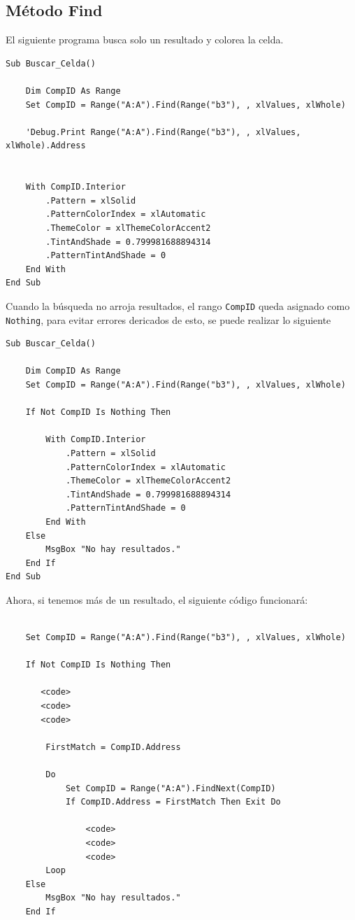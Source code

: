 \subsection{Método Find}


El siguiente programa busca solo un resultado y colorea la celda.

\begin{verbatim}
Sub Buscar_Celda()

    Dim CompID As Range
    Set CompID = Range("A:A").Find(Range("b3"), , xlValues, xlWhole)
    
    'Debug.Print Range("A:A").Find(Range("b3"), , xlValues, xlWhole).Address

    
    With CompID.Interior
        .Pattern = xlSolid
        .PatternColorIndex = xlAutomatic
        .ThemeColor = xlThemeColorAccent2
        .TintAndShade = 0.799981688894314
        .PatternTintAndShade = 0
    End With
End Sub
\end{verbatim}

Cuando la búsqueda no arroja resultados, el rango \texttt{CompID} queda asignado como \texttt{Nothing}, para evitar errores dericados de esto, se puede realizar lo siguiente

\begin{verbatim}
Sub Buscar_Celda()

    Dim CompID As Range
    Set CompID = Range("A:A").Find(Range("b3"), , xlValues, xlWhole)
    
    If Not CompID Is Nothing Then
    
        With CompID.Interior
            .Pattern = xlSolid
            .PatternColorIndex = xlAutomatic
            .ThemeColor = xlThemeColorAccent2
            .TintAndShade = 0.799981688894314
            .PatternTintAndShade = 0
        End With
    Else
        MsgBox "No hay resultados."
    End If
End Sub
\end{verbatim}


Ahora, si tenemos más de un resultado, el siguiente código funcionará:

\begin{verbatim}

    Set CompID = Range("A:A").Find(Range("b3"), , xlValues, xlWhole)
    
    If Not CompID Is Nothing Then
    
       <code>
       <code>
       <code>
       
        FirstMatch = CompID.Address
        
        Do
            Set CompID = Range("A:A").FindNext(CompID)
            If CompID.Address = FirstMatch Then Exit Do
            
                <code>
                <code>
                <code>
        Loop
    Else
        MsgBox "No hay resultados."
    End If
\end{verbatim}

